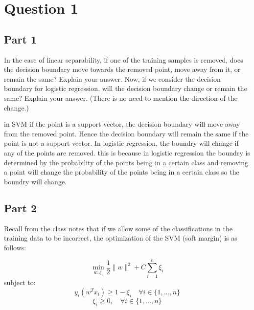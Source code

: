 \section{Question 1}
\subsection{Part 1}
In the case of linear separability, if one of the training samples is removed, does the decision boundary move towards the removed point, move away from it, or remain the same? Explain your answer. Now, if we consider the decision boundary for logistic regression, will the decision boundary change or remain the same? Explain your answer. (There is no need to mention the direction of the change.)
\begin{qsolve}
	\begin{qsolve}[]
		in SVM if the point is a support vector, the decision boundary will move away from the removed point. Hence the decision boundary will remain the same if the point is not a support vector. In logistic regression, the boundry will change if any of the points are removed. this is because in logistic regression the boundry is determined by the probability of the points being in a certain class and removing a point will change the probability of the points being in a certain class so the boundry will change.
	\end{qsolve}
\end{qsolve}
\subsection{Part 2}
Recall from the class notes that if we allow some of the classifications in the training data to be incorrect, the optimization of the SVM (soft margin) is as follows:

\[
\min_{w,\xi_i} \frac{1}{2} \|w\|^2 + C \sum_{i=1}^{n} \xi_i
\]
subject to:
\[
y_i(w^T x_i) \geq 1 - \xi_i \quad \forall i \in \{1,\dots,n\}
\]
\[
\xi_i \geq 0, \quad \forall i \in \{1,\dots,n\}
\]

